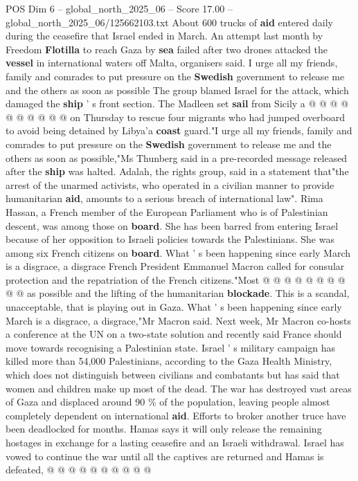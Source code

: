 \begin{textsample}{POS Dim 6 – global\_north\_2025\_06 – Score 17.00 – global\_north\_2025\_06/125662103.txt}
About 600 trucks of \textbf{aid} entered daily during the ceasefire that Israel ended in March.
An attempt last month by Freedom \textbf{Flotilla} to reach Gaza by \textbf{sea} failed after two drones attacked the \textbf{vessel} in international waters off Malta, organisers said.
I urge all my friends, family and comrades to put pressure on the \textbf{Swedish} government to release me and the others as soon as possible The group blamed Israel for the attack, which damaged the \textbf{ship} ' s front section.
The Madleen set \textbf{sail} from Sicily a @ @ @ @ @ @ @ @ @ @ on Thursday to rescue four migrants who had jumped overboard to avoid being detained by Libya'a \textbf{coast} guard."I urge all my friends, family and comrades to put pressure on the \textbf{Swedish} government to release me and the others as soon as possible,"Ms Thunberg said in a pre-recorded message released after the \textbf{ship} was halted.
Adalah, the rights group, said in a statement that"the arrest of the unarmed activists, who operated in a civilian manner to provide humanitarian \textbf{aid}, amounts to a serious breach of international law".
Rima Hassan, a French member of the European Parliament who is of Palestinian descent, was among those on \textbf{board}.
She has been barred from entering Israel because of her opposition to Israeli policies towards the Palestinians.
She was among six French citizens on \textbf{board}.
What ' s been happening since early March is a disgrace, a disgrace French President Emmanuel Macron called for consular protection and the repatriation of the French citizens."Most @ @ @ @ @ @ @ @ @ @ as possible and the lifting of the humanitarian \textbf{blockade}.
This is a scandal, unacceptable, that is playing out in Gaza.
What ' s been happening since early March is a disgrace, a disgrace,"Mr Macron said.
Next week, Mr Macron co-hosts a conference at the UN on a two-state solution and recently said France should move towards recognising a Palestinian state.
Israel ' s military campaign has killed more than 54,000 Palestinians, according to the Gaza Health Ministry, which does not distinguish between civilians and combatants but has said that women and children make up most of the dead.
The war has destroyed vast areas of Gaza and displaced around 90 \% of the population, leaving people almost completely dependent on international \textbf{aid}.
Efforts to broker another truce have been deadlocked for months.
Hamas says it will only release the remaining hostages in exchange for a lasting ceasefire and an Israeli withdrawal.
Israel has vowed to continue the war until all the captives are returned and Hamas is defeated, @ @ @ @ @ @ @ @ @ @

\end{textsample}
